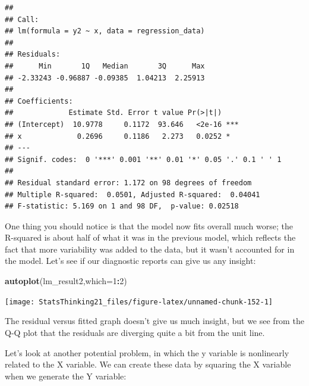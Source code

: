 \documentclass[12pt,]{book}
\newenvironment{Shaded}{\begin{snugshade}}{\end{snugshade}}
\newcommand{\DataTypeTok}[1]{\textcolor[rgb]{0.13,0.29,0.53}{#1}}
\newcommand{\DecValTok}[1]{\textcolor[rgb]{0.00,0.00,0.81}{#1}}
\newcommand{\KeywordTok}[1]{\textcolor[rgb]{0.13,0.29,0.53}{\textbf{#1}}}
\newcommand{\NormalTok}[1]{#1}
\newcommand{\OperatorTok}[1]{\textcolor[rgb]{0.81,0.36,0.00}{\textbf{#1}}}
\newcommand{\StringTok}[1]{\textcolor[rgb]{0.31,0.60,0.02}{#1}}
\begin{document}
\begin{verbatim}
## 
## Call:
## lm(formula = y2 ~ x, data = regression_data)
## 
## Residuals:
##      Min       1Q   Median       3Q      Max 
## -2.33243 -0.96887 -0.09385  1.04213  2.25913 
## 
## Coefficients:
##             Estimate Std. Error t value Pr(>|t|)    
## (Intercept)  10.9778     0.1172  93.646   <2e-16 ***
## x             0.2696     0.1186   2.273   0.0252 *  
## ---
## Signif. codes:  0 '***' 0.001 '**' 0.01 '*' 0.05 '.' 0.1 ' ' 1
## 
## Residual standard error: 1.172 on 98 degrees of freedom
## Multiple R-squared:  0.0501, Adjusted R-squared:  0.04041 
## F-statistic: 5.169 on 1 and 98 DF,  p-value: 0.02518
\end{verbatim}

One thing you should notice is that the model now fits overall much worse; the R-squared is about half of what it was in the previous model, which reflects the fact that more variability was added to the data, but it wasn't accounted for in the model. Let's see if our diagnostic reports can give us any insight:

\begin{Shaded}
\begin{Highlighting}[]
\KeywordTok{autoplot}\NormalTok{(lm_result2,}\DataTypeTok{which=}\DecValTok{1}\OperatorTok{:}\DecValTok{2}\NormalTok{)}
\end{Highlighting}
\end{Shaded}

\texttt{[image: StatsThinking21\_files/figure-latex/unnamed-chunk-152-1]}

The residual versus fitted graph doesn't give us much insight, but we see from the Q-Q plot that the residuals are diverging quite a bit from the unit line.

Let's look at another potential problem, in which the y variable is nonlinearly related to the X variable. We can create these data by squaring the X variable when we generate the Y variable:

\begin{Shaded}
\end{Shaded}
\end{document}
